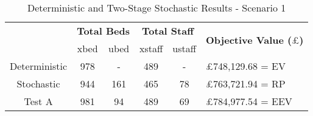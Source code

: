 \documentclass[../thesis.tex]{subfiles}
\begin{document}
\begin{table}[h!]
    \centering
    \begin{tabular}{cccccl}\toprule
 & \multicolumn{2}{l}{\textbf{Total Beds}} & \multicolumn{2}{c}{\textbf{Total Staff}} & \multirow{2}{*}{\textbf{Objective Value ($\pounds$)}}\\ \cmidrule(lr){2-3} \cmidrule(lr){4-5}
         
 & xbed           & ubed          & xstaff         & ustaff         \\ \midrule
 Deterministic & 978 & - & 489 & - & $\pounds$748,129.68 = EV \\
 Stochastic & 944 & 161 & 465 & 78 & $\pounds$763,721.94 = RP \\
 Test A & 981 & 94 & 489 & 69 & $\pounds$784,977.54 = EEV \\\bottomrule
    \end{tabular}
    \caption{Deterministic and Two-Stage Stochastic Results - Scenario 1}
    \label{tab:Scenario1Results}
\end{table}







\end{document}
